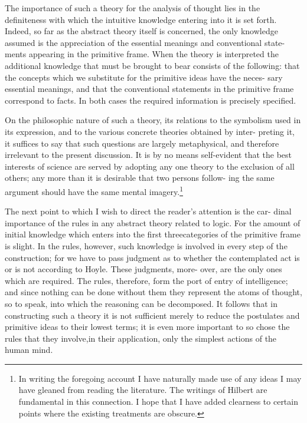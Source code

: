 \documentclass[9pt, twoside]{extarticle}
\begin{document}
The importance of such a theory for the analysis of thought lies in the
definiteness with which the intuitive knowledge entering into it is set forth.
Indeed, so far as the abstract theory itself is concerned, the only knowledge
assumed is the appreciation of the essential meanings and conventional state-
ments appearing in the primitive frame. When the theory is interpreted the
additional knowledge that must be brought to bear consists of the following:
that the concepts which we substitute for the primitive ideas have the neces-
sary essential meanings, and that the conventional statements in the primitive
frame correspond to facts. In both cases the required information is precisely
specified.

On the philosophic nature of such a theory, its relations to the symbolism
used in its expression, and to the various concrete theories obtained by inter-
preting it, it suffices to say that such questions are largely metaphysical, and
therefore irrelevant to the present discussion. It is by no means self-evident
that the best interests of science are served by adopting any one theory to the
exclusion of all others; any more than it is desirable that two persons follow-
ing the same argument should have the same mental imagery.\footnote{In writing the foregoing account I have naturally made use of any ideas I may have gleaned from reading the literature. The writings of Hilbert are fundamental in this connection. I hope that I have added clearness to certain points where the existing treatments are obscure.}

The next point to which I wish to direct the reader's attention is the car-
dinal importance of the rules in any abstract theory related to logic. For the
amount of initial knowledge which enters into the first threecategories of the
primitive frame is slight. In the rules, however, such knowledge is involved
in every step of the construction; for we have to pass judgment as to whether
the contemplated act is or is not according to Hoyle. These judgments, more-
over, are the only ones which are required. The rules, therefore, form the
port of entry of intelligence; and since nothing can be done without them
they represent the atoms of thought, so to speak, into which the reasoning
can be decomposed. It follows that in constructing such a theory it is not
sufficient merely to reduce the postulates and primitive ideas to their lowest
terms; it is even more important to so chose the rules that they involve,in
their application, only the simplest actions of the human mind.
\end{document}
